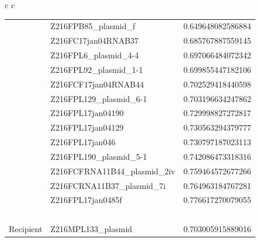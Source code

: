 \documentclass[conference]{IEEEtran}
\begin{document}
\begin{table}[]
\begin{tabular}{ c c}
\begin{tabular}{l l l}
&	Z216FPB85\_plasmid\_f	&	0.649648082586884	\\
&	Z216FC17jan04RNAB37	&	0.685767887559145	\\
&	Z216FPL6\_plasmid\_4-4	&	0.697066484072342	\\
&	Z216FPL92\_plasmid\_1-1	&	0.699855447182106	\\
&	Z216FCF17jan04RNAB44	&	0.702529418440598	\\
&	Z216FPL129\_plasmid\_6-1	&	0.703196634247862	\\
&	Z216FPL17jan04190	&	0.729998827272817	\\
&	Z216FPL17jan04129	&	0.730563294379777	\\
&	Z216FPL17jan046	&	0.730797187023113	\\
&	Z216FPL190\_plasmid\_5-1	&	0.742086473318316	\\
&	Z216FCFRNA11B44\_plasmid\_2iv	&	0.759464572677266	\\
&	Z216FCRNA11B37\_plasmid\_7i	&	0.764963184767281	\\
&	Z216FPL17jan0485f	&	0.776617270079055	\\

	& \ &\ \\
	\hline
Recipient &	Z216MPL133\_plasmid	&	0.703005915889016	\\


\end{tabular}
\end{tabular}
\end{table}
\end{document}
